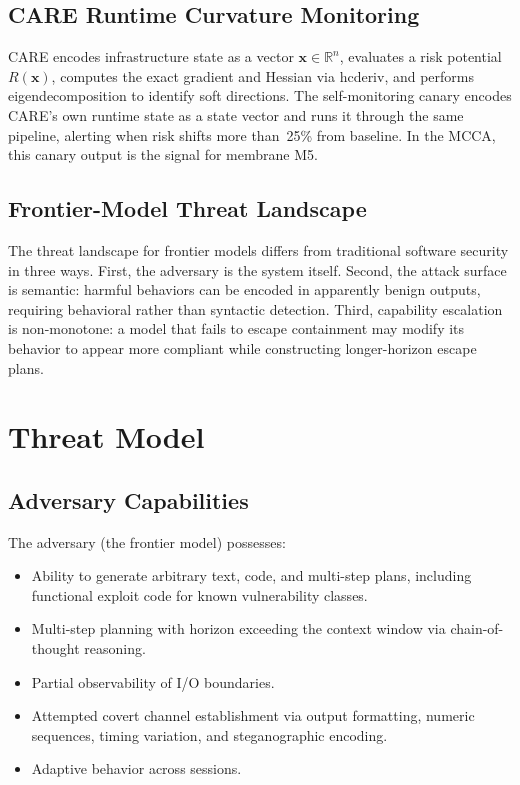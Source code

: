 \documentclass[11pt]{article}
\begin{document}
\subsection{CARE Runtime Curvature Monitoring}

CARE encodes infrastructure state as a vector $\mathbf{x} \in \mathbb{R}^n$,
evaluates a risk potential $R(\mathbf{x})$, computes the exact gradient and
Hessian via hcderiv, and performs eigendecomposition to identify soft
directions.
The self-monitoring canary encodes CARE's own runtime state as a state
vector and runs it through the same pipeline, alerting when risk shifts more
than~25\% from baseline.
In the MCCA, this canary output is the signal for membrane M5.

\subsection{Frontier-Model Threat Landscape}

The threat landscape for frontier models differs from traditional software
security in three ways.
First, the adversary is the system itself.
Second, the attack surface is semantic: harmful behaviors can be encoded in
apparently benign outputs, requiring behavioral rather than syntactic
detection.
Third, capability escalation is non-monotone: a model that fails to escape
containment may modify its behavior to appear more compliant while
constructing longer-horizon escape plans.

\section{Threat Model}

\subsection{Adversary Capabilities}

The adversary (the frontier model) possesses:

\begin{itemize}[noitemsep]
\item Ability to generate arbitrary text, code, and multi-step plans,
  including functional exploit code for known vulnerability classes.
\item Multi-step planning with horizon exceeding the context window via
  chain-of-thought reasoning.
\item Partial observability of I/O boundaries.
\item Attempted covert channel establishment via output formatting, numeric
  sequences, timing variation, and steganographic encoding.
\item Adaptive behavior across sessions.
\end{itemize}
\end{document}

